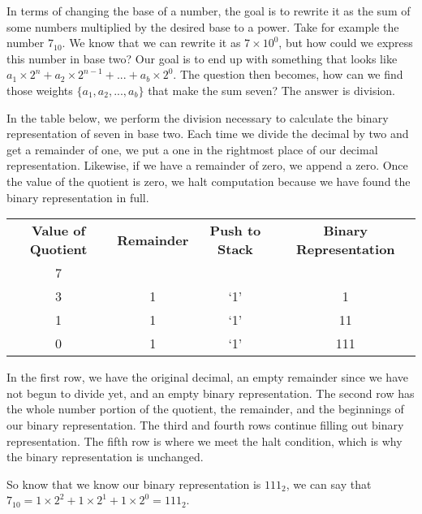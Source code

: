 \documentclass[12pt]{article}
\begin{document}
\par In terms of changing the base of a number, the goal is to rewrite it as the sum of some numbers multiplied by the desired base to a power. Take for example the number $7_{10}$. We know that we can rewrite it as $7\times10^0$, but how could we express this number in base two? Our goal is to end up with something that looks like $a_1\times2^{n} + a_2\times2^{n-1} + ... + a_b\times2^0$. The question then becomes, how can we find those weights $\{a_1, a_2, ..., a_b\}$ that make the sum seven? The answer is division.

\par In the table below, we perform the division necessary to calculate the binary representation of seven in base two. Each time we divide the decimal by two and get a remainder of one, we put a one in the rightmost place of our decimal representation. Likewise, if we have a remainder of zero, we append a zero. Once the value of the quotient is zero, we halt computation because we have found the binary representation in full.

\begin{center}
  \begin{tabular}{c|c|c|c}
    \textbf{Value of Quotient} & \textbf{Remainder} & \textbf{Push to Stack} & \textbf{Binary Representation} \\
    7 &   &     & \\
    3 & 1 & `1' & 1 \\
    1 & 1 & `1' & 11 \\
    0 & 1 & `1' & 111
  \end{tabular}
\end{center}

\par In the first row, we have the original decimal, an empty remainder since we have not begun to divide yet, and an empty binary representation. The second row has the whole number portion of the quotient, the remainder, and the beginnings of our binary representation. The third and fourth rows continue filling out binary representation. The fifth row is where we meet the halt condition, which is why the binary representation is unchanged.

\par So know that we know our binary representation is $111_2$, we can say that $7_{10} = 1\times2^2+1\times2^1+1\times2^0 = 111_2$.



\newpage %
\end{document}
